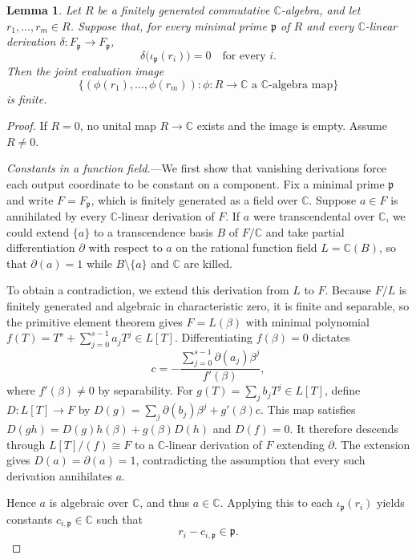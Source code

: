 \documentclass[aps,prl,reprint,notitlepage,nofootinbib,nobibnotes]{revtex4-2}
\newtheorem{lemma}{Lemma}
\begin{document}
\begin{lemma}\label{lem:algebraic-finite-image}
Let $R$ be a finitely generated commutative $\mathbb C$-algebra, and let $r_1,\ldots,r_m\in R$.
Suppose that, for every minimal prime $\mathfrak p$ of $R$ and every $\mathbb C$-linear derivation
$\delta:F_{\mathfrak p}\to F_{\mathfrak p}$,
\[
 \delta\bigl(\iota_{\mathfrak p}(r_i)\bigr)=0
 \quad\text{for every }i.
\]
Then the joint evaluation image
\[
 \{(\phi(r_1),\ldots,\phi(r_m)):
          \phi:R\to\mathbb C\text{ a }\mathbb C\text{-algebra map}\}
\]
is finite.
\end{lemma}

\begin{proof}
If $R=0$, no unital map $R\to\mathbb C$ exists and the image is empty. Assume $R\ne0$.

\emph{Constants in a function field.}---We first show that vanishing derivations force each output
coordinate to be constant on a component. Fix a minimal prime $\mathfrak p$ and write
$F=F_{\mathfrak p}$, which is finitely generated as a field over $\mathbb C$. Suppose $a\in F$ is
annihilated by every $\mathbb C$-linear derivation of $F$. If $a$ were transcendental over $\mathbb
C$, we could extend $\{a\}$ to a transcendence basis $B$ of $F/\mathbb C$ and take partial
differentiation $\partial$ with respect to $a$ on the rational function field $L=\mathbb C(B)$, so
that $\partial(a)=1$ while $B\setminus\{a\}$ and $\mathbb C$ are killed.

To obtain a contradiction, we extend this derivation from $L$ to $F$. Because $F/L$ is finitely
generated and algebraic in characteristic zero, it is finite and separable, so the primitive
element theorem gives $F=L(\beta)$ with minimal polynomial $f(T)=T^s+\sum_{j=0}^{s-1}a_jT^j\in
L[T]$. Differentiating $f(\beta)=0$ dictates
\[
 c=-\frac{\sum_{j=0}^{s-1}\partial(a_j)\beta^j}{f'(\beta)},
\]
where $f'(\beta)\ne 0$ by separability. For $g(T)=\sum_j b_jT^j\in L[T]$, define $D:L[T]\to F$ by
$D(g)=\sum_j\partial(b_j)\beta^j+g'(\beta)c$. This map satisfies $D(gh)=D(g)h(\beta)+g(\beta)D(h)$
and $D(f)=0$. It therefore descends through $L[T]/(f)\cong F$ to a $\mathbb C$-linear derivation of
$F$ extending $\partial$. The extension gives $D(a)=\partial(a)=1$, contradicting the assumption
that every such derivation annihilates $a$.

Hence $a$ is algebraic over $\mathbb C$, and thus $a\in\mathbb C$. Applying this to each
$\iota_{\mathfrak p}(r_i)$ yields constants $c_{i,\mathfrak p}\in\mathbb C$ such that
\begin{equation}\label{eq:component-constants}
 r_i-c_{i,\mathfrak p}\in\mathfrak p.
\end{equation}


\end{proof}
\end{document}
